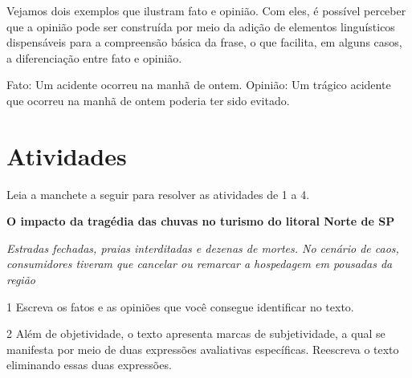 {Vejamos dois exemplos que ilustram fato e opinião. Com eles, é possível
perceber que a opinião pode ser construída por meio da adição de
elementos linguísticos dispensáveis para a compreensão básica da frase,
o que facilita, em alguns casos, a diferenciação entre fato e opinião.

Fato: Um acidente ocorreu na manhã de ontem. 
Opinião: Um trágico acidente que ocorreu na manhã de ontem poderia ter sido evitado.}

\section*{Atividades}

Leia a manchete a seguir para resolver as atividades de 1 a 4.

\begin{myquote}
\textbf{O impacto da tragédia das chuvas no turismo do litoral Norte de
SP}

\emph{Estradas fechadas, praias interditadas e dezenas de mortes. No
cenário de caos, consumidores tiveram que cancelar ou remarcar a
hospedagem em pousadas da região}
\end{myquote}


\num{1} Escreva os fatos e as opiniões que você consegue identificar no texto.


\num{2} Além de objetividade, o texto apresenta marcas de subjetividade,
a qual se manifesta por meio de duas expressões avaliativas específicas.
Reescreva o texto eliminando essas duas expressões.


